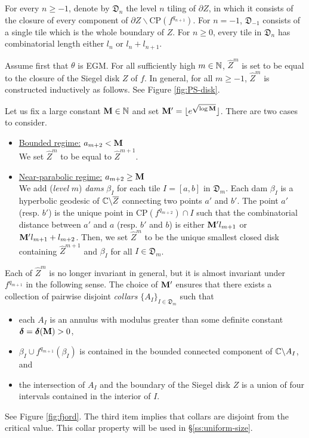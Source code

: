 \documentclass{amsart}
\begin{document}
For every $n \geq -1$, denote by $\mathfrak{D}_n$ the level $n$ tiling of $\partial Z$, in which it consists of the closure of every component of $\partial Z \backslash \text{CP}(f^{q_{n+1}})$. 
For $n =-1$, $\mathfrak{D}_{-1}$ consists of a single tile which is the whole boundary of $Z$.
For $n \geq 0$, every tile in $\mathfrak{D}_n$ has combinatorial length either $l_n$ or $l_n + l_{n+1}$.

Assume first that $\theta$ is EGM. For all sufficiently high $m \in \mathbb{N}$, $\hat{Z}^m$ is set to be equal to the closure of the Siegel disk $Z$ of $f$. 
In general, for all $m\geq -1$, $\hat{Z}^m$ is constructed inductively as follows. See Figure \ref{fig:PS-disk}.

Let us fix a large constant $\mathbf{M} \in \mathbb{N}$ and set $\mathbf{M}' = \lfloor e^{\sqrt{\log \mathbf{M}}} \rfloor$. There are two cases to consider.
\begin{itemize}
    \item \underline{Bounded regime:} $a_{m+2}< \mathbf{M}$ \\
    We set $\hat{Z}^m$ to be equal to $\hat{Z}^{m+1}$.
    \item \underline{Near-parabolic regime:} $a_{m+2} \geq \mathbf{M}$ \\
    We add (\emph{level} $m$) \emph{dams} $\beta_I$ for each tile $I=[a,b]$ in $\mathfrak{D}_m$. 
    Each dam $\beta_I$ is a hyperbolic geodesic of $\mathbb{C} \backslash \overline{Z}$ connecting two points $a'$ and $b'$. The point $a'$ (resp. $b'$) is the unique point in $\text{CP}(f^{q_{m+2}}) \cap I$ such that the combinatorial distance between $a'$ and $a$ (resp. $b'$ and $b$) is either $\mathbf{M}'l_{m+1}$ or $\mathbf{M}'l_{m+1}+l_{m+2}$. 
    Then, we set $\hat{Z}^m$ to be the unique smallest closed disk containing $\hat{Z}^{m+1}$ and $\beta_I$ for all $I \in \mathfrak{D}_m$.
\end{itemize}

Each of $\hat{Z}^m$ is no longer invariant in general, but it is almost invariant under $f^{q_{m+1}}$ in the following sense. 
The choice of $\mathbf{M}'$ ensures that there exists a collection of pairwise disjoint \emph{collars} $\{A_I\}_{I \in \mathfrak{D}_m}$ such that 
\begin{itemize}
    \item each $A_I$ is an annulus with modulus greater than some definite constant $\boldsymbol{\delta} = \boldsymbol{\delta}(\mathbf{M})>0$,
    \item $\beta_I \cup f^{q_{m+1}}(\beta_I)$ is contained in the bounded connected component of $\mathbb{C} \backslash A_I$, and
    \item the intersection of $A_I$ and the boundary of the Siegel disk $Z$ is a union of four intervals contained in the interior of $I$. 
\end{itemize}
See Figure \ref{fig:fjord}. 
The third item implies that collars are disjoint from the critical value.
This collar property will be used in \S\ref{ss:uniform-size}.
\end{document}
